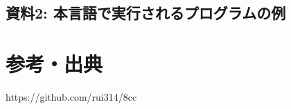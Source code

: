 \documentclass[11pt,a4j]{jarticle}
\begin{document}
\subsection{資料2: 本言語で実行されるプログラムの例}






\section{参考・出典}


https://github.com/rui314/8cc
\end{document}
